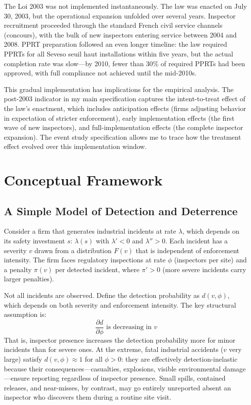 \documentclass[12pt]{article}
\begin{document}
The Loi 2003 was not implemented instantaneously. The law was enacted on July 30, 2003, but the operational expansion unfolded over several years. Inspector recruitment proceeded through the standard French civil service channels (concours), with the bulk of new inspectors entering service between 2004 and 2008. PPRT preparation followed an even longer timeline: the law required PPRTs for all Seveso seuil haut installations within five years, but the actual completion rate was slow---by 2010, fewer than 30\% of required PPRTs had been approved, with full compliance not achieved until the mid-2010s.

This gradual implementation has implications for the empirical analysis. The post-2003 indicator in my main specification captures the intent-to-treat effect of the law's enactment, which includes anticipation effects (firms adjusting behavior in expectation of stricter enforcement), early implementation effects (the first wave of new inspectors), and full-implementation effects (the complete inspector expansion). The event study specification allows me to trace how the treatment effect evolved over this implementation window.


\section{Conceptual Framework}
\label{sec:framework}

\subsection{A Simple Model of Detection and Deterrence}

Consider a firm that generates industrial incidents at rate $\lambda$, which depends on its safety investment $s$: $\lambda(s)$ with $\lambda' < 0$ and $\lambda'' > 0$. Each incident has a severity $v$ drawn from a distribution $F(v)$ that is independent of enforcement intensity. The firm faces regulatory inspections at rate $\phi$ (inspectors per site) and a penalty $\pi(v)$ per detected incident, where $\pi' > 0$ (more severe incidents carry larger penalties).

Not all incidents are observed. Define the detection probability as $d(v, \phi)$, which depends on both severity and enforcement intensity. The key structural assumption is:
\begin{equation}
\frac{\partial d}{\partial \phi} \text{ is decreasing in } v
\label{eq:detection_elasticity}
\end{equation}
That is, inspector presence increases the detection probability more for minor incidents than for severe ones. At the extreme, fatal industrial accidents ($v$ very large) satisfy $d(v, \phi) \approx 1$ for all $\phi > 0$: they are effectively detection-inelastic because their consequences---casualties, explosions, visible environmental damage---ensure reporting regardless of inspector presence. Small spills, contained releases, and near-misses, by contrast, may go entirely unreported absent an inspector who discovers them during a routine site visit.
\end{document}
